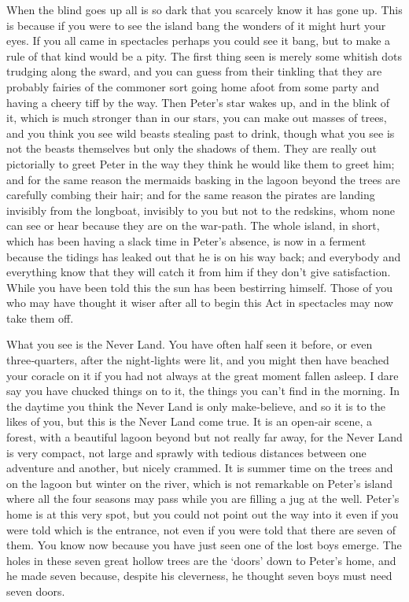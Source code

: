 

\begin{stagedir}

When the blind goes up all is so dark that you scarcely know it has gone up.
This is because if you were to see the island bang
the wonders of it might hurt your eyes.
If you all came in spectacles perhaps you could see it bang,
but to make a rule of that kind would be a pity.
The first thing seen is merely some whitish dots trudging along the sward,
and you can guess from their tinkling that they are probably fairies of the commoner sort
going home afoot from some party and having a cheery tiff by the way.
Then Peter’s star wakes up,
and in the blink of it, which is much stronger than in our stars, you can make out masses of trees,
and you think you see wild beasts stealing past to drink,
though what you see is not the beasts themselves but only the shadows of them.
They are really out pictorially to greet Peter in the way they think he would like them to greet him;
and for the same reason the mermaids basking in the lagoon beyond the trees are carefully combing their hair;
and for the same reason the pirates are landing invisibly from the longboat,
invisibly to you but not to the redskins, whom none can see or hear because they are on the war‐path.
The whole island, in short, which has been having a slack time in Peter’s absence,
is now in a ferment because the tidings has leaked out that he is on his way back;
and everybody and everything know that they will catch it from him if they don’t give satisfaction.
While you have been told this the sun
has been bestirring himself.
Those of you who may have thought it wiser after all to begin this Act in spectacles may now take them off.

What you see is the Never Land.
You have often half seen it before, or even three‐quarters, after the night‐lights were lit,
and you might then have beached your coracle on it if you had not always at the great moment fallen asleep.
I dare say you have chucked things on to it, the things you can’t find in the morning.
In the daytime you think the Never Land is only make‐believe, and so it is to the likes of you,
but this is the Never Land come true.
It is an open‐air scene, a forest,
with a beautiful lagoon beyond but not really far away, for the Never Land is very compact,
not large and sprawly with tedious distances between one adventure and another, but nicely crammed.
It is summer time on the trees and on the lagoon but winter on the river,
which is not remarkable on Peter’s island where all the four seasons may pass while you are filling a jug at the well.
Peter’s home is at this very spot,
but you could not point out the way into it even if you were told which is the entrance,
not even if you were told that there are seven of them.
You know now because you have just seen one of the lost boys emerge.
The holes in these seven great hollow trees are the ‘doors’ down to Peter’s home,
and he made seven because, despite his cleverness, he thought seven boys must need seven doors.


\end{stagedir}

